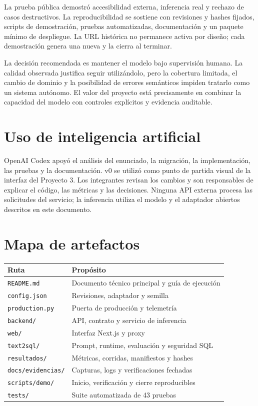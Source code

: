 \documentclass[11pt,letterpaper]{article}
\newcommand{\code}[1]{\texttt{#1}}
\begin{document}
La prueba pública demostró accesibilidad externa, inferencia real y rechazo de casos destructivos.
La reproducibilidad se sostiene con revisiones y hashes fijados, scripts de demostración, pruebas
automatizadas, documentación y un paquete mínimo de despliegue. La URL histórica no permanece
activa por diseño; cada demostración genera una nueva y la cierra al terminar.

La decisión recomendada es mantener el modelo bajo supervisión humana. La calidad observada justifica
seguir utilizándolo, pero la cobertura limitada, el cambio de dominio y la posibilidad de errores
semánticos impiden tratarlo como un sistema autónomo. El valor del proyecto está precisamente en
combinar la capacidad del modelo con controles explícitos y evidencia auditable.

\section*{Uso de inteligencia artificial}

OpenAI Codex apoyó el análisis del enunciado, la migración, la implementación, las pruebas y la
documentación. v0 se utilizó como punto de partida visual de la interfaz del Proyecto 3. Los
integrantes revisan los cambios y son responsables de explicar el código, las métricas y las
decisiones. Ninguna API externa procesa las solicitudes del servicio; la inferencia utiliza el
modelo y el adaptador abiertos descritos en este documento.

\section*{Mapa de artefactos}

\begin{tabularx}{\textwidth}{@{}lX@{}}
\toprule
\textbf{Ruta} & \textbf{Propósito}\\
\midrule
\code{README.md} & Documento técnico principal y guía de ejecución\\
\code{config.json} & Revisiones, adaptador y semilla\\
\code{production.py} & Puerta de producción y telemetría\\
\code{backend/} & API, contrato y servicio de inferencia\\
\code{web/} & Interfaz Next.js y proxy\\
\code{text2sql/} & Prompt, runtime, evaluación y seguridad SQL\\
\code{resultados/} & Métricas, corridas, manifiestos y hashes\\
\code{docs/evidencias/} & Capturas, logs y verificaciones fechadas\\
\code{scripts/demo/} & Inicio, verificación y cierre reproducibles\\
\code{tests/} & Suite automatizada de 43 pruebas\\
\bottomrule
\end{tabularx}
\end{document}
